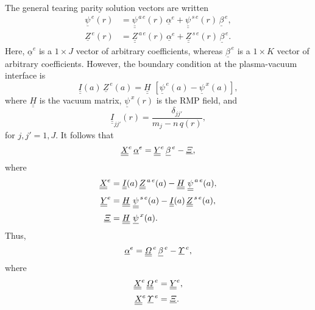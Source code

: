 \documentclass[12pt,prb,aps,notitlepage]{revtex4-1}
\begin{document}
The general tearing parity solution vectors are written
\begin{align}
\underline{\psi}^{\,e}(r) &= \underline{\underline{\psi}}^{\,a\,e}(r)\,\underline{\alpha}^e+  \underline{\underline{\psi}}^{\,s\,e}(r)\,\underline{\beta}^{\,e},\\[0.5ex]
\underline{Z}^{\,e}(r) &= \underline{\underline{Z}}^{\,a\,e}(r)\,\underline{\alpha}^e+  \underline{\underline{Z}}^{\,s\,e}(r)\,\underline{\beta}^{\,e}.
\end{align}
Here, $\underline{\alpha}^e$ is a $1\times J$ vector of arbitrary coefficients, whereas $\underline{\beta}^{\,e}$ is a $1\times K$ vector of arbitrary coefficients. 
However, the boundary condition at the plasma-vacuum interface is 
\begin{equation}
\underline{\underline{I}}(a)\,\underline{Z}^{\,e}(a) = \underline{\underline{H}}\,\,[\underline{\psi}^{\,e}(a)-\underline{\psi}^{\,x}(a)],
\end{equation}
where $\underline{\underline{H}}$ is the vacuum matrix,  $\underline{\psi}^{\,x}(r)$ is the RMP field, and 
\begin{equation}
\underline{\underline{I}}_{jj'}(r) =\frac{\delta_{jj'}}{ m_j-n\,q(r)}, 
\end{equation}
for $j,j'= 1,J$. 
It follows that
\begin{equation}
\underline{\underline{X}}^e\,\underline{\alpha}^e = \underline{\underline{Y}}^e\,\underline{\beta}^{\,e} -\underline{\mit\Xi},
\end{equation}
where
\begin{align}
\underline{\underline{X}}^e &= \underline{\underline{I}}(a)\,\underline{\underline{Z}}^{\,a\,e}(a)- \underline{\underline{H}}\,\,\underline{\underline{\psi}}^{\,a\,e}(a),\\[0.5ex]
\underline{\underline{Y}}^e &= \underline{\underline{H}}\,\,\underline{\underline{\psi}}^{\,s\,e}(a)- \underline{\underline{I}}(a)\,\underline{\underline{Z}}^{\,s\,e}(a),\\[0.5ex]
\underline{\mit\Xi} &= \underline{\underline{H}}\,\,\underline{\psi}^{\,x}(a).
\end{align}
Thus,
\begin{equation}
\underline{\alpha}^e = \underline{\underline{\mit\Omega}}^{\,e}\,\underline{\beta}^{\,e}- \underline{\mit\Upsilon}^{\,e},
\end{equation}
where
\begin{align}
\underline{\underline{X}}^e\,\underline{\underline{\mit\Omega}}^{\,e}&= \underline{\underline{Y}}^e,\\[0.5ex]
\underline{\underline{X}}^e\,\underline{\mit\Upsilon}^{\,e}&=\underline{\mit\Xi}.
\end{align}
\end{document}
